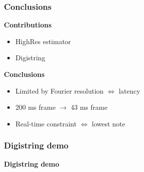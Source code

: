 \documentclass[table]{beamer}
\begin{document}


\begin{frame}
\frametitle{Conclusions}
    {\large \textbf{Contributions}}
    \begin{itemize}
        \item HighRes estimator
        \item Digistring
    \end{itemize}
    \bigskip

    {\large \textbf{Conclusions}}
    \begin{itemize}
        \item Limited by Fourier resolution $\Leftrightarrow$ latency
        \item 200 ms frame $\rightarrow$ 43 ms frame
        \item Real-time constraint $\Leftrightarrow$ lowest note
    \end{itemize}
\end{frame}


\begin{frame}
\frametitle{Digistring demo}
    \begin{center}
        {\huge \textbf{Digistring demo}}
    \end{center}
\end{frame}
\end{document}
